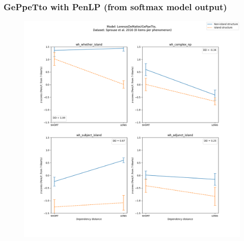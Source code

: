 \subsubsection{GePpeTto with PenLP (from softmax model output)}
\begin{figure}[h]
	\centering
	\includegraphics[width=1\textwidth]{images/Chapter1/Sprouse_wh_LorenzoDeMattei_GePpeTto_PenLP-zscores-likert-2022-07-11.png} 
\end{figure}

\clearpage
